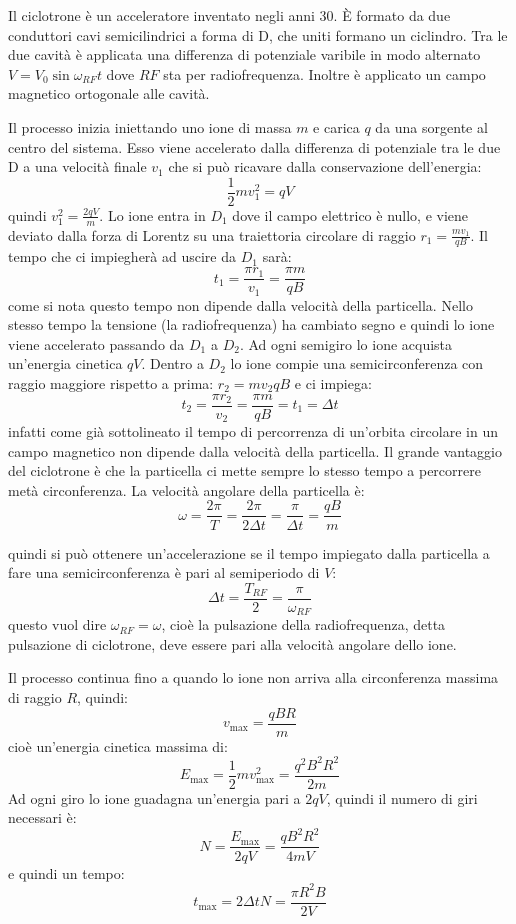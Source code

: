 \begin{Es}[Ciclotrone]
  Il ciclotrone  è un acceleratore inventato negli anni 30. È formato da due conduttori cavi semicilindrici a forma di D, che uniti formano un ciclindro. Tra le due cavità è applicata una differenza di potenziale varibile in modo alternato $V=V_0\sin\omega_{RF}t$ dove $RF$ sta per radiofrequenza. Inoltre è applicato un campo magnetico ortogonale alle cavità.

  Il processo inizia iniettando uno ione di massa $m$ e carica $q$ da una sorgente al centro del sistema. Esso viene accelerato dalla differenza di potenziale tra le due D a una velocità finale $v_1$ che si può ricavare dalla conservazione dell'energia:
  \[
    \frac{1}{2}mv_1^2 = qV
  \]
  quindi $v_1^2 = \frac{2qV}{m}$. Lo ione entra in $D_1$ dove il campo elettrico è nullo, e viene deviato dalla forza di Lorentz su una traiettoria circolare di raggio $r_1=\frac{m v_1}{qB}$. Il tempo che ci impiegherà ad uscire da $D_1$ sarà:
  \[
    t_1 = \frac{\pi r_1}{v_1}=\frac{\pi m}{qB}
  \]
  come si nota questo tempo non dipende dalla velocità della particella. Nello stesso tempo la tensione (la radiofrequenza) ha cambiato segno e quindi lo ione viene accelerato passando da $D_1$ a $D_2$. Ad ogni semigiro lo ione acquista un'energia cinetica $qV$. Dentro a $D_2$ lo ione compie una semicirconferenza con raggio maggiore rispetto a prima: $r_2={m v_2}{qB}$ e ci impiega:
  \[
    t_2 = \frac{\pi r_2}{v_2}=\frac{\pi m}{qB} = t_1 = \Delta t
  \]
  infatti come già sottolineato il tempo di percorrenza di un'orbita circolare in un campo magnetico non dipende dalla velocità della particella. Il grande vantaggio del ciclotrone è che la particella ci mette sempre lo stesso tempo a percorrere metà circonferenza. La velocità angolare della particella è:
  \[
    \omega = \frac{2\pi}{T} = \frac{2\pi}{2\Delta t} = \frac{\pi}{\Delta t} = \frac{qB}{m}
  \]

  quindi si può ottenere un'accelerazione se il tempo impiegato dalla particella a fare una semicirconferenza è pari al semiperiodo di $V$:
  \[
    \Delta t = \frac{T_{RF}}{2} = \frac{\pi}{\omega_{RF}}
  \]
  questo vuol dire $\omega_{RF}=\omega$, cioè la pulsazione della radiofrequenza, detta pulsazione di ciclotrone, deve essere pari alla velocità angolare dello ione.

  Il processo continua fino a quando lo ione non arriva alla circonferenza massima di raggio $R$, quindi:
  \[
    v_{\max} = \frac{qBR}{m}
  \]
  cioè un'energia cinetica massima di:
  \[
    E_{\max} = \frac{1}{2}mv_{\max}^2 = \frac{q^2 B^2 R^2}{2m}
  \]
  Ad ogni giro lo ione guadagna un'energia pari a $2qV$, quindi il numero di giri necessari è:
  \[
    N = \frac{E_{\max}}{2qV} = \frac{qB^2R^2}{4mV}
  \]
  e quindi un tempo:
  \[
    t_{\max} = 2\Delta tN = \frac{\pi R^2 B}{2V}
  \]


\end{Es}
